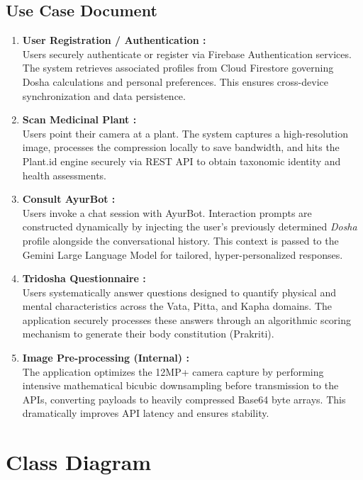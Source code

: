 \documentclass[12pt, a4paper]{report}
\begin{document}
\newpage
\subsection{Use Case Document}
\begin{enumerate}
    \item \textbf{ User Registration / Authentication : }\\ 
    Users securely authenticate or register via Firebase Authentication services. The system retrieves associated profiles from Cloud Firestore governing Dosha calculations and personal preferences. This ensures cross-device synchronization and data persistence.

    \item \textbf{ Scan Medicinal Plant : } \\
    Users point their camera at a plant. The system captures a high-resolution image, processes the compression locally to save bandwidth, and hits the Plant.id engine securely via REST API to obtain taxonomic identity and health assessments.

    \item \textbf{ Consult AyurBot : } \\
    Users invoke a chat session with AyurBot. Interaction prompts are constructed dynamically by injecting the user's previously determined \textit{Dosha} profile alongside the conversational history. This context is passed to the Gemini Large Language Model for tailored, hyper-personalized responses.

     \item \textbf{ Tridosha Questionnaire :}\\
      Users systematically answer questions designed to quantify physical and mental characteristics across the Vata, Pitta, and Kapha domains. The application securely processes these answers through an algorithmic scoring mechanism to generate their body constitution (Prakriti).

   \item \textbf{ Image Pre-processing (Internal) :}\\
    The application optimizes the 12MP+ camera capture by performing intensive mathematical bicubic downsampling before transmission to the APIs, converting payloads to heavily compressed Base64 byte arrays. This dramatically improves API latency and ensures stability.    
\end{enumerate}


\newpage
\section{Class Diagram}
\end{document}
